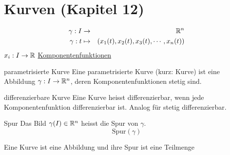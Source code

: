 \section{Kurven (Kapitel 12)}
\begin{align*}
  \gamma:I&\to& \mathbb{R}^n\\
  \gamma:t&\mapsto&\left(x_1(t),x_2(t),x_3(t),\cdots,x_n(t)\right)
\end{align*}
$x_i:I\to\mathbb{R}$ \underline{Komponentenfunktionen}
\begin{Def}{parametrisierte Kurve}
  Eine parametrisierte Kurve (kurz: Kurve) ist eine Abbildung $\gamma:I\to\mathbb{R}^n$, deren Komponentenfunktionen stetig sind.
\end{Def}
\begin{Def}{differenzierbare Kurve}
  Eine Kurve heisst differenzierbar, wenn jede Komponentenfunktion differenzierbar ist. Analog für stetig differenzierbar.
\end{Def}
\begin{Def}{Spur}
  Das Bild $\gamma(I)\in\mathbb{R}^n$ heisst die Spur von $\gamma$.
  \[\text{Spur}(\gamma)\]
\end{Def}
\begin{Bem}
  Eine Kurve ist eine Abbildung und ihre Spur ist eine Teilmenge
\end{Bem}
